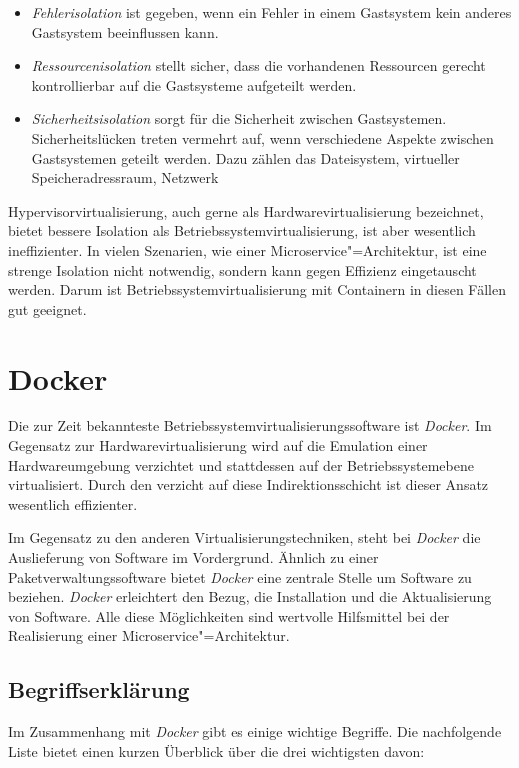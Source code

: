 \begin{itemize}
	\item \textit{Fehlerisolation} ist gegeben, wenn ein Fehler in einem Gastsystem kein anderes Gastsystem beeinflussen kann.
	\item \textit{Ressourcenisolation} stellt sicher, dass die vorhandenen Ressourcen gerecht \bzw kontrollierbar auf die Gastsysteme aufgeteilt werden.
	\item \textit{Sicherheitsisolation} sorgt für die Sicherheit zwischen Gastsystemen. Sicherheitslücken treten vermehrt auf, wenn verschiedene Aspekte zwischen Gastsystemen geteilt werden. Dazu zählen \zB das Dateisystem, virtueller Speicheradressraum, Netzwerk \usw
\end{itemize}

Hypervisorvirtualisierung, auch gerne als Hardwarevirtualisierung bezeichnet, bietet bessere Isolation als Betriebssystemvirtualisierung, ist aber wesentlich ineffizienter. In vielen Szenarien, wie einer Microservice"=Architektur, ist eine strenge Isolation nicht notwendig, sondern kann gegen Effizienz eingetauscht werden. Darum ist Betriebssystemvirtualisierung mit Containern in diesen Fällen gut geeignet.

\section{Docker}

Die zur Zeit bekannteste Betriebssystemvirtualisierungssoftware ist \textit{Docker}. Im Gegensatz zur Hardwarevirtualisierung wird auf die Emulation einer Hardwareumgebung verzichtet und stattdessen auf der Betriebssystemebene virtualisiert. Durch den verzicht auf diese Indirektionsschicht ist dieser Ansatz wesentlich effizienter.

Im Gegensatz zu den anderen Virtualisierungstechniken, steht bei \textit{Docker} die Auslieferung von Software im Vordergrund. Ähnlich zu einer Paketverwaltungssoftware bietet \textit{Docker} eine zentrale Stelle um Software zu beziehen. \textit{Docker} erleichtert den Bezug, die Installation und die Aktualisierung von Software. Alle diese Möglichkeiten sind wertvolle Hilfsmittel bei der Realisierung einer Microservice"=Architektur.

\subsection{Begriffserklärung}

Im Zusammenhang mit \textit{Docker} gibt es einige wichtige Begriffe. Die nachfolgende Liste bietet einen kurzen Überblick über die drei wichtigsten davon:

